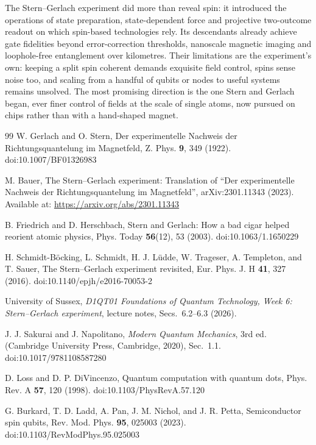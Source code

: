 \documentclass[12pt]{article}
\begin{document}
The Stern--Gerlach experiment did more than reveal spin: it introduced the operations of state preparation, state-dependent force and projective two-outcome readout on which spin-based technologies rely. Its descendants already achieve gate fidelities beyond error-correction thresholds, nanoscale magnetic imaging and loophole-free entanglement over kilometres. Their limitations are the experiment's own: keeping a split spin coherent demands exquisite field control, spins sense noise too, and scaling from a handful of qubits or nodes to useful systems remains unsolved. The most promising direction is the one Stern and Gerlach began, ever finer control of fields at the scale of single atoms, now pursued on chips rather than with a hand-shaped magnet.

\begin{thebibliography}{99}
\small
{} W. Gerlach and O. Stern, Der experimentelle Nachweis der Richtungsquantelung im Magnetfeld, Z. Phys. \textbf{9}, 349 (1922). doi:10.1007/BF01326983

 M. Bauer, The Stern--Gerlach experiment: Translation of ``Der experimentelle Nachweis der Richtungsquantelung im Magnetfeld'', arXiv:2301.11343 (2023). Available at: \url{https://arxiv.org/abs/2301.11343}

 B. Friedrich and D. Herschbach, Stern and Gerlach: How a bad cigar helped reorient atomic physics, Phys. Today \textbf{56}(12), 53 (2003). doi:10.1063/1.1650229

 H. Schmidt-B\"ocking, L. Schmidt, H. J. L\"udde, W. Trageser, A. Templeton, and T. Sauer, The Stern--Gerlach experiment revisited, Eur. Phys. J. H \textbf{41}, 327 (2016). doi:10.1140/epjh/e2016-70053-2

 University of Sussex, \emph{D1QT01 Foundations of Quantum Technology, Week 6: Stern--Gerlach experiment}, lecture notes, Secs.~6.2--6.3 (2026).

 J. J. Sakurai and J. Napolitano, \emph{Modern Quantum Mechanics}, 3rd ed. (Cambridge University Press, Cambridge, 2020), Sec.~1.1. doi:10.1017/9781108587280

 D. Loss and D. P. DiVincenzo, Quantum computation with quantum dots, Phys. Rev. A \textbf{57}, 120 (1998). doi:10.1103/PhysRevA.57.120

 G. Burkard, T. D. Ladd, A. Pan, J. M. Nichol, and J. R. Petta, Semiconductor spin qubits, Rev. Mod. Phys. \textbf{95}, 025003 (2023). doi:10.1103/RevModPhys.95.025003


\end{thebibliography}
\end{document}
